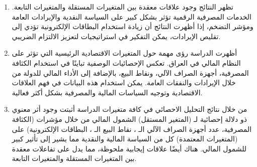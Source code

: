 \documentclass[10pt,a4paper]{report}
\begin{document}
\begin{doublespacing}
\begin{enumerate}
\item تظهر النتائج وجود علاقات معقدة بين المتغيرات المستقلة والمتغيرات التابعة. الخدمات المصرفية الرقمية تؤثر بشكل كبير على السياسة النقدية والإيرادات العامة ومؤشر التضخم، إذا أظهرت النتائج أن زيادة استخدام البطاقات الإلكترونية تؤدي إلى تقليص الإيرادات، يمكن التفكير في استراتيجيات لتعزيز الالتزام الضريبي.
\item أظهرت الدراسة رؤى مهمة حول المتغيرات الاقتصادية الرئيسية التي تؤثر على النظام المالي في العراق. تعكس الإحصائيات الوصفية تباينًا في استخدام الكثافة المصرفية، أجهزة الصراف الآلي، ونقاط البيع، بالإضافة إلى الأداء المالي للدولة من خلال الإيرادات والنفقات العامة. يمكن استخدام هذه البيانات في فهم العلاقات الاقتصادية وتوجيه السياسات المالية والمصرفية بشكل أكثر فعالية.
\item من خلال نتائج التحليل الاحصائي في كافة متغيرات الدراسة أثبتت وجود أثر معنوي ذو دلالة إحصائية لـ (المتغير المستقل) الشمول المالي من خلال مؤشرات (الكثافة المصرفية، عدد أجهزة الصراف الآلي الـ ، نقاط البيع الـ ، البطاقات الإلكترونية) على (المتغيرات المعتمدة) كل من السياسة المالية والنقدية مما يشير إلى تأثير كبير للشمول المالي. هناك أيضًا علاقات إيجابية ملحوظة، مما يدل على تفاعلات معقدة بين المتغيرات المستقلة والمتغيرات التابعة.
\end{enumerate}
\clearpage

\end{doublespacing}
\end{document}
